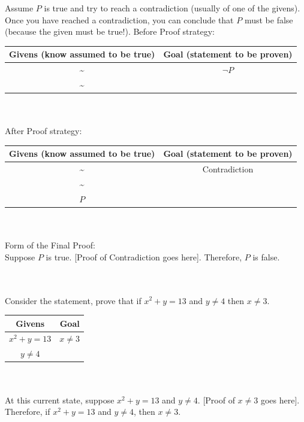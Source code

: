 \documentclass[../setup.tex]{subfiles}
\begin{document}
\begin{theorem}
	Assume $P$ is true and try to reach a contradiction (usually of one of the givens). Once you have reached a contradiction, you can conclude that $P$ must be false (because the given must be true!).
	Before Proof strategy:
	\begin{center}
	\begin{tabular}[t]{| c | c |}
		\hline
		Givens (know assumed to be true) & Goal (statement to be proven) \\
		\hline
		\textasciitilde & $\lnot{P}$ \\
		\textasciitilde & \\
		\hline
	\end{tabular}
	\end{center}
	\phantom \\ \\
	After Proof strategy:
	\begin{center}
	\begin{tabular}[t]{| c | c |}
		\hline
		Givens (know assumed to be true) & Goal (statement to be proven) \\
		\hline
		\textasciitilde & Contradiction \\
		\textasciitilde & \\
		$P$ & \\
		\hline
	\end{tabular}
	\end{center}
	\phantom \\ \\
	Form of the Final Proof: \\
	Suppose $P$ is true. [Proof of Contradiction goes here]. Therefore, $P$ is false.
\end{theorem}
\phantom \\ \\
Consider the statement, prove that if $x^2 + y = 13$ and $y \neq 4$ then $x \neq 3$.
\begin{center}
	\begin{tabular}[t]{| c | c |}
		\hline
		Givens  & Goal  \\
		\hline
		$x^2 + y = 13$ & $x \neq 3$ \\
		$y \neq 4$ & \\
		\hline
	\end{tabular}
\end{center}
\phantom \\ \\
At this current state, suppose $x^2 + y =13$ and $y \neq 4$. [Proof of $x \neq 3$ goes here]. Therefore, if $x^2 + y =13$ and $y \neq 4$, then $x \neq 3$. \\
\end{document}
